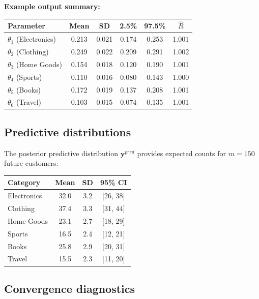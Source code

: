 \textbf{Example output summary:}
\begin{center}
\begin{tabular}{lccccc}
\hline
\textbf{Parameter} & \textbf{Mean} & \textbf{SD} & \textbf{2.5\%} & \textbf{97.5\%} & \textbf{$\hat{R}$} \\
\hline
$\theta_1$ (Electronics) & 0.213 & 0.021 & 0.174 & 0.253 & 1.001 \\
$\theta_2$ (Clothing) & 0.249 & 0.022 & 0.209 & 0.291 & 1.002 \\
$\theta_3$ (Home Goods) & 0.154 & 0.018 & 0.120 & 0.190 & 1.001 \\
$\theta_4$ (Sports) & 0.110 & 0.016 & 0.080 & 0.143 & 1.000 \\
$\theta_5$ (Books) & 0.172 & 0.019 & 0.137 & 0.208 & 1.001 \\
$\theta_6$ (Travel) & 0.103 & 0.015 & 0.074 & 0.135 & 1.001 \\
\hline
\end{tabular}
\end{center}

\subsection{Predictive distributions}

The posterior predictive distribution $\mathbf{y}^{pred}$ provides expected counts for $m=150$ future customers:
\begin{center}
\begin{tabular}{lccc}
\hline
\textbf{Category} & \textbf{Mean} & \textbf{SD} & \textbf{95\% CI} \\
\hline
Electronics & 32.0 & 3.2 & [26, 38] \\
Clothing & 37.4 & 3.3 & [31, 44] \\
Home Goods & 23.1 & 2.7 & [18, 29] \\
Sports & 16.5 & 2.4 & [12, 21] \\
Books & 25.8 & 2.9 & [20, 31] \\
Travel & 15.5 & 2.3 & [11, 20] \\
\hline
\end{tabular}
\end{center}

\subsection{Convergence diagnostics}

